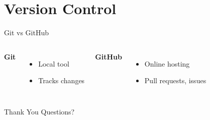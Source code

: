 \documentclass{beamer}
\begin{document}
\section{Version Control}
\begin{frame}{Git vs GitHub}
  \begin{columns}
      \textbf{Git}
      \begin{itemize}
        \item Local tool
        \item Tracks changes
      \end{itemize}
      \textbf{GitHub}
      \begin{itemize}
        \item Online hosting
        \item Pull requests, issues
      \end{itemize}
  \end{columns}
\end{frame}

\begin{frame}{Thank You}
  \centering
  \Large Questions?
\end{frame}
\end{document}
